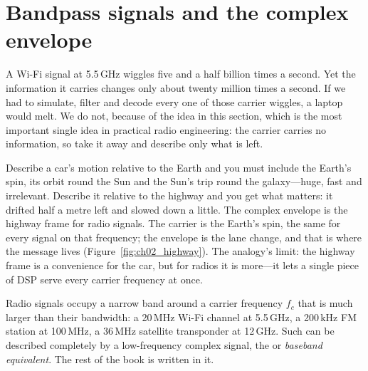\section{Bandpass signals and the complex envelope}
\label{sec:complexenvelope}

A Wi-Fi signal at 5.5\,GHz wiggles five and a half billion times a second. Yet the information it
carries changes only about twenty million times a second. If we had to simulate, filter and decode
every one of those carrier wiggles, a laptop would melt. We do not, because of the idea in this
section, which is the most important single idea in practical radio engineering: the carrier carries
no information, so take it away and describe only what is left.

\begin{analogy}
Describe a car's motion relative to the Earth and you must include the Earth's spin, its orbit round
the Sun and the Sun's trip round the galaxy---huge, fast and irrelevant. Describe it relative to the
highway and you get what matters: it drifted half a metre left and slowed down a little. The complex
envelope is the highway frame for radio signals. The carrier is the Earth's spin, the same for every
signal on that frequency; the envelope is the lane change, and that is where the message lives
(Figure~\ref{fig:ch02_highway}). The analogy's limit: the highway frame is a convenience for the car,
but for radios it is more---it lets a single piece of DSP serve every carrier frequency at once.
\end{analogy}

Radio signals occupy a narrow band around a carrier frequency $f_c$ that is much larger
than their bandwidth: a 20\,MHz Wi-Fi channel at 5.5\,GHz, a 200\,kHz FM station at
100\,MHz, a 36\,MHz satellite transponder at 12\,GHz. Such  can be
described completely by a low-frequency complex signal, the  or
\emph{baseband equivalent}. The rest of the book is written in it.


